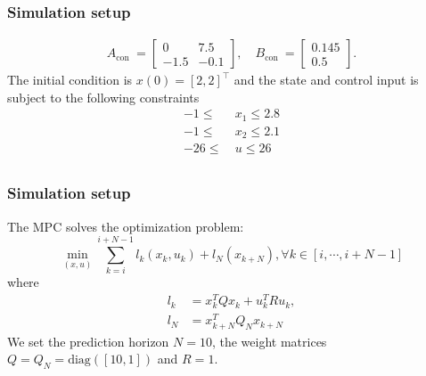 \documentclass[student, noshadow, lsr, english, aspectratio=169]{ITR_LSR_slides}
\begin{document}
\begin{frame}
	\frametitle{Simulation setup}
	\begin{equation}
		\begin{split}
			A_{\text {con }}=\left[\begin{array}{cc}
				0 & 7.5 \\
				-1.5 & -0.1
			\end{array}\right], \quad B_{\text {con }}=\left[\begin{array}{c}
				0.145 \\
				0.5
			\end{array}\right].
		\end{split}
	\end{equation}
The initial condition is $x(0) = [2,2]^{\top}$ and the state and control input is subject to the following constraints
\begin{equation}
	\begin{split}
		-1 \leq\  &x_1 \leq 2.8\\
		-1 \leq\  &x_2 \leq 2.1\\
		-26 \leq\  &u \leq 26\\
	\end{split}
\end{equation}
\end{frame}

\begin{frame}
	\frametitle{Simulation setup}
The MPC solves the optimization problem:
$$
\min _{(x, u)} \sum_{k=i}^{i+N-1} l_{k}\left(x_{k}, u_{k}\right)+l_{N}\left(x_{k+N}\right),\forall k \in[i, \cdots, i+N-1]
$$
where
$$
\begin{aligned}
	l_{k} &=x_{k}^{T} Q x_{k}+u_{k}^{T} R u_{k}, \\
	l_{N} &=x_{k+N}^{T} Q_{N} x_{k+N}
\end{aligned}
$$
We set the prediction horizon $N = 10$, the weight matrices $Q =
Q_N =\text{diag}([10, 1])$ and $R = 1$.
\end{frame}
\end{document}
